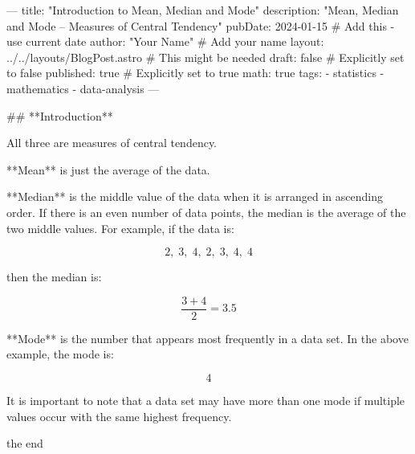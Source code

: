 ---
title: "Introduction to Mean, Median and Mode"
description: "Mean, Median and Mode – Measures of Central Tendency"
pubDate: 2024-01-15  # Add this - use current date
author: "Your Name"   # Add your name
layout: ../../layouts/BlogPost.astro  # This might be needed
draft: false          # Explicitly set to false
published: true       # Explicitly set to true
math: true
tags:
  - statistics
  - mathematics
  - data-analysis
---

## **Introduction**

All three are measures of central tendency.

**Mean** is just the average of the data.

**Median** is the middle value of the data when it is arranged in ascending order.  
If there is an even number of data points, the median is the average of the two middle values.  
For example, if the data is:

$$
2,\; 3,\; 4,\; 2,\; 3,\; 4,\; 4
$$

then the median is:

$$
\frac{3 + 4}{2} = 3.5
$$

**Mode** is the number that appears most frequently in a data set.  
In the above example, the mode is:

$$
4
$$

It is important to note that a data set may have more than one mode if multiple values occur with the same highest frequency.

the end 
